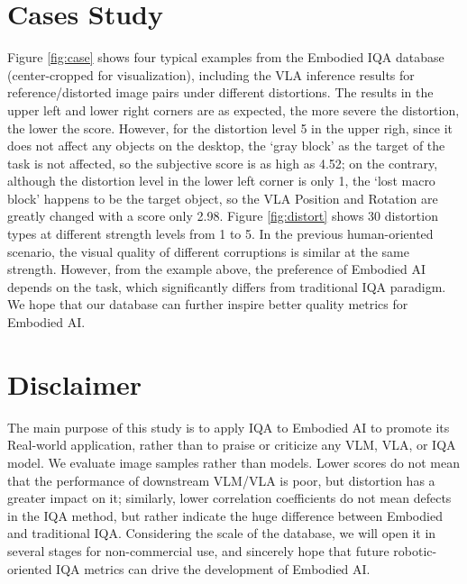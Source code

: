 \documentclass{article}
\begin{document}
\section{Cases Study}
Figure \ref{fig:case} shows four typical examples from the Embodied IQA database (center-cropped for visualization), including the VLA inference results for reference/distorted image pairs under different distortions. The results in the upper left and lower right corners are as expected, the more severe the distortion, the lower the score. However, for the distortion level 5 in the upper righ, since it does not affect any objects on the desktop, the `gray block' as the target of the task is not affected, so the subjective score is as high as 4.52; on the contrary, although the distortion level in the lower left corner is only 1, the `lost macro block' happens to be the target object, so the VLA Position and Rotation are greatly changed with a score only 2.98.
Figure \ref{fig:distort} shows 30 distortion types at different strength levels from 1 to 5. In the previous human-oriented scenario, the visual quality of different corruptions is similar at the same strength. However, from the example above, the preference of Embodied AI depends on the task, which significantly differs from traditional IQA paradigm.  We hope that our database can further inspire better quality metrics for Embodied AI.

\section{Disclaimer}
The main purpose of this study is to apply IQA to Embodied AI to promote its Real-world application, rather than to praise or criticize any VLM, VLA, or IQA model.
We evaluate image samples rather than models. Lower scores do not mean that the performance of downstream VLM/VLA is poor, but distortion has a greater impact on it; similarly, lower correlation coefficients do not mean defects in the IQA method, but rather indicate the huge difference between Embodied and traditional IQA.
Considering the scale of the database, we will open it in several stages for non-commercial use, and sincerely hope that future robotic-oriented IQA metrics can drive the development of Embodied AI.




\end{document}
